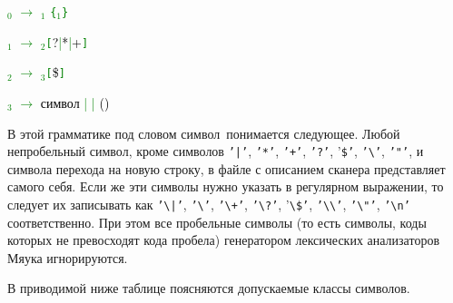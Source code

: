 \documentclass[10pt]{report}
\begin{document}
\textcolor{Green}{$_0$ $\to$ $_1$ \texttt{\{}$_1$\texttt{\}}
}

\textcolor{Green}{$_1$ $\to$ $_2$\texttt{[}\textcolor{Black}{?}|\textcolor{Black}{*}|\textcolor{Black}{+}\texttt{]} }

\textcolor{Green}{$_2$ $\to$ $_3$\texttt{[}\textcolor{Black}{\$}\texttt{]} }

\textcolor{Green}{$_3$ $\to$ \textcolor{Black}{символ} |  | \textcolor{Black}{(}\textcolor{Black}{)}}


В этой грамматике под словом \glqq символ\grqq\ понимается следующее. Любой непробельный символ, кроме символов \texttt{'|'}, \texttt{'*'}, \texttt{'+'}, \texttt{'?'},
'\texttt{\$'}, \texttt{'\textbackslash'}, \texttt{'"{}'}, и символа перехода на новую строку, в файле с описанием сканера представляет самого себя. Если же эти символы нужно
указать в регулярном выражении, то следует их записывать как \texttt{'\textbackslash|'}, \texttt{'\textbackslash*'}, \texttt{'\textbackslash+'}, \texttt{'\textbackslash?'},
'\texttt{\textbackslash\$'}, \texttt{'\textbackslash\textbackslash'}, \texttt{'\textbackslash"{}'}, \texttt{'\textbackslash{}n'} соответственно. При этом все пробельные 
символы (то есть символы, коды которых не превосходят кода пробела) генератором лексических анализаторов Мяука игнорируются.

В приводимой ниже таблице поясняются допускаемые классы символов. %
\end{document}
